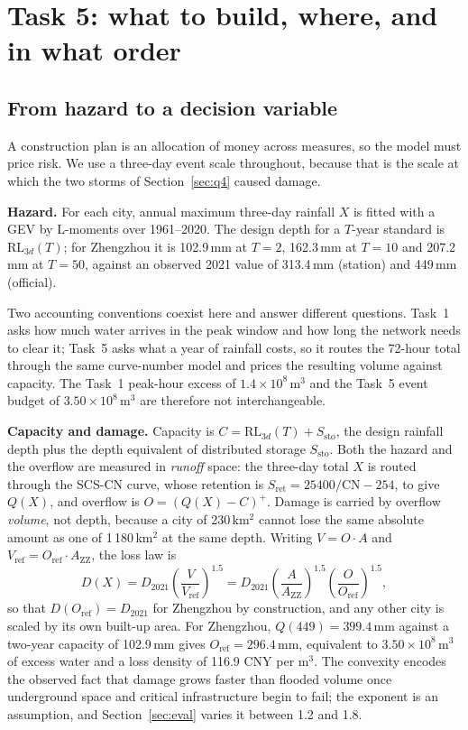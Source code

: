 \section{Task 5: what to build, where, and in what order}\label{sec:q5}

\subsection{From hazard to a decision variable}

A construction plan is an allocation of money across measures, so the model must price risk. We use a three-day event scale throughout, because that is the scale at which the two storms of Section~\ref{sec:q4} caused damage.

\textbf{Hazard.} For each city, annual maximum three-day rainfall $X$ is fitted with a GEV by L-moments over 1961--2020. The design depth for a $T$-year standard is $\mathrm{RL}_{3d}(T)$; for Zhengzhou it is 102.9\,mm at $T=2$, 162.3\,mm at $T=10$ and 207.2\,mm at $T=50$, against an observed 2021 value of 313.4\,mm (station) and 449\,mm (official).

Two accounting conventions coexist here and answer different questions. Task~1 asks how much water arrives in the peak window and how long the network needs to clear it; Task~5 asks what a year of rainfall costs, so it routes the 72-hour total through the same curve-number model and prices the resulting volume against capacity. The Task~1 peak-hour excess of $1.4\times10^{8}$\,m$^3$ and the Task~5 event budget of $3.50\times10^{8}$\,m$^3$ are therefore not interchangeable.

\textbf{Capacity and damage.} Capacity is $C=\mathrm{RL}_{3d}(T)+S_{\text{sto}}$, the design rainfall depth plus the depth equivalent of distributed storage $S_{\text{sto}}$. Both the hazard and the overflow are measured in \emph{runoff} space: the three-day total $X$ is routed through the SCS-CN curve, whose retention is $S_{\text{ret}}=25400/\mathrm{CN}-254$, to give $Q(X)$, and overflow is $O=(Q(X)-C)^+$. Damage is carried by overflow \emph{volume}, not depth, because a city of 230\,km$^2$ cannot lose the same absolute amount as one of 1\,180\,km$^2$ at the same depth. Writing $V=O\cdot A$ and $V_{\text{ref}}=O_{\text{ref}}\cdot A_{\text{ZZ}}$, the loss law is
\[
D(X)=D_{2021}\left(\frac{V}{V_{\text{ref}}}\right)^{1.5}
       =D_{2021}\left(\frac{A}{A_{\text{ZZ}}}\right)^{1.5}
        \left(\frac{O}{O_{\text{ref}}}\right)^{1.5},
\]
so that $D(O_{\text{ref}})=D_{2021}$ for Zhengzhou by construction, and any other city is scaled by its own built-up area. For Zhengzhou, $Q(449)=399.4$\,mm against a two-year capacity of 102.9\,mm gives $O_{\text{ref}}=296.4$\,mm, equivalent to $3.50\times10^{8}$\,m$^3$ of excess water and a loss density of 116.9 CNY per m$^3$. The convexity encodes the observed fact that damage grows faster than flooded volume once underground space and critical infrastructure begin to fail; the exponent is an assumption, and Section~\ref{sec:eval} varies it between 1.2 and 1.8.

